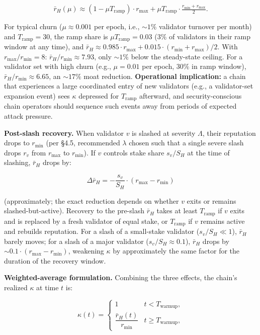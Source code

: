 \documentclass[
  11pt,
]{article}
\begin{document}
\[\bar{r}_H(\mu) \approx (1 - \mu T_{\text{ramp}}) \cdot r_{\max} + \mu T_{\text{ramp}} \cdot \tfrac{r_{\min} + r_{\max}}{2}.\]

For typical churn (\(\mu \approx 0.001\) per epoch, i.e., \(\sim 1\%\)
validator turnover per month) and \(T_{\text{ramp}} = 30\), the ramp
share is \(\mu T_{\text{ramp}} = 0.03\) (\(3\%\) of validators in their
ramp window at any time), and
\(\bar{r}_H \approx 0.985 \cdot r_{\max} + 0.015 \cdot (r_{\min} + r_{\max})/2\).
With \(r_{\max}/r_{\min} = 8\): \(\bar{r}_H/r_{\min} \approx 7.93\),
only \(\sim 1\%\) below the steady-state ceiling. For a validator set
with high churn (e.g., \(\mu = 0.01\) per epoch, \(30\%\) in ramp
window), \(\bar{r}_H/r_{\min} \approx 6.65\), an \(\sim 17\%\) moat
reduction. \textbf{Operational implication:} a chain that experiences a
large coordinated entry of new validators (e.g., a validator-set
expansion event) sees \(\kappa\) depressed for \(T_{\text{ramp}}\)
afterward, and security-conscious chain operators should sequence such
events away from periods of expected attack pressure.

\textbf{Post-slash recovery.} When validator \(v\) is slashed at
severity \(\Lambda\), their reputation drops to \(r_{\min}\) (per §4.5,
recommended \(\lambda\) chosen such that a single severe slash drops
\(r_v\) from \(r_{\max}\) to \(r_{\min}\)). If \(v\) controls stake
share \(s_v / S_H\) at the time of slashing, \(\bar{r}_H\) drops by:

\[\Delta \bar{r}_H = -\frac{s_v}{S_H} \cdot (r_{\max} - r_{\min})\]

(approximately; the exact reduction depends on whether \(v\) exits or
remains slashed-but-active). Recovery to the pre-slash \(\bar{r}_H\)
takes at least \(T_{\text{ramp}}\) if \(v\) exits and is replaced by a
fresh validator of equal stake, or \(T_{\text{ramp}}\) if \(v\) remains
active and rebuilds reputation. For a slash of a small-stake validator
(\(s_v / S_H \ll 1\)), \(\bar{r}_H\) barely moves; for a slash of a
major validator (\(s_v / S_H \approx 0.1\)), \(\bar{r}_H\) drops by
\(\sim 0.1 \cdot (r_{\max} - r_{\min})\), weakening \(\kappa\) by
approximately the same factor for the duration of the recovery window.

\textbf{Weighted-average formulation.} Combining the three effects, the
chain's realized \(\kappa\) at time \(t\) is:

\[\kappa(t) = \begin{cases} 1 & t < T_{\text{warmup}}, \\ \dfrac{\bar{r}_H(t)}{r_{\min}} & t \geq T_{\text{warmup}}, \end{cases}\]
\end{document}
